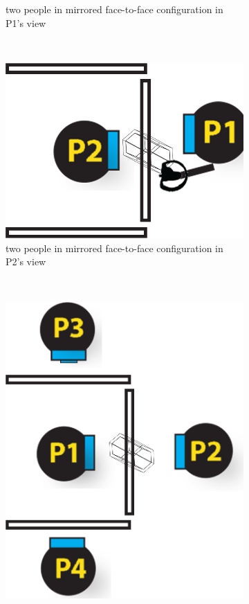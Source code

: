 \documentclass[chi_draft]{sigchi}
\begin{document}
\begin{figure}
\begin{subfigure}[b]{0.3\columnwidth}
        \caption{two people in mirrored face-to-face configuration in P1's view}
        \label{fig:f2f1}
    \end{subfigure}
    ~ %
    \begin{subfigure}[b]{0.3\columnwidth}
        \includegraphics[width=1\columnwidth]{f2f-2.png}
        \caption{two people in mirrored face-to-face configuration in P2's view}
        \label{fig:f2f3}
    \end{subfigure}
    ~ %
    \begin{subfigure}[b]{0.3\columnwidth}
        \includegraphics[width=1\columnwidth]{f2f-4.png}

\end{subfigure}
\end{figure}
\end{document}
